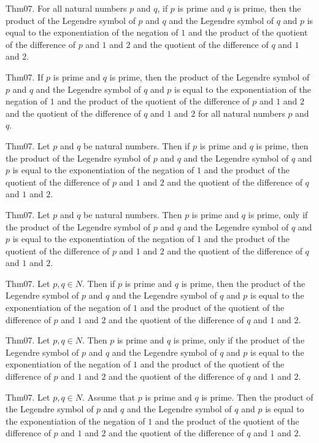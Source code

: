 \documentclass{article}
\begin{document}
Thm07. For all natural numbers $p$ and $q$, if $p$ is prime and $q$ is prime, then the product of the Legendre symbol of $p$ and $q$ and the Legendre symbol of $q$ and $p$ is equal to the exponentiation of the negation of $1$ and the product of the quotient of the difference of $p$ and $1$ and $2$ and the quotient of the difference of $q$ and $1$ and $2$.

Thm07. If $p$ is prime and $q$ is prime, then the product of the Legendre symbol of $p$ and $q$ and the Legendre symbol of $q$ and $p$ is equal to the exponentiation of the negation of $1$ and the product of the quotient of the difference of $p$ and $1$ and $2$ and the quotient of the difference of $q$ and $1$ and $2$ for all natural numbers $p$ and $q$.

Thm07. Let $p$ and $q$ be natural numbers. Then if $p$ is prime and $q$ is prime, then the product of the Legendre symbol of $p$ and $q$ and the Legendre symbol of $q$ and $p$ is equal to the exponentiation of the negation of $1$ and the product of the quotient of the difference of $p$ and $1$ and $2$ and the quotient of the difference of $q$ and $1$ and $2$.

Thm07. Let $p$ and $q$ be natural numbers. Then $p$ is prime and $q$ is prime, only if the product of the Legendre symbol of $p$ and $q$ and the Legendre symbol of $q$ and $p$ is equal to the exponentiation of the negation of $1$ and the product of the quotient of the difference of $p$ and $1$ and $2$ and the quotient of the difference of $q$ and $1$ and $2$.

Thm07. Let $p , q \in N$. Then if $p$ is prime and $q$ is prime, then the product of the Legendre symbol of $p$ and $q$ and the Legendre symbol of $q$ and $p$ is equal to the exponentiation of the negation of $1$ and the product of the quotient of the difference of $p$ and $1$ and $2$ and the quotient of the difference of $q$ and $1$ and $2$.

Thm07. Let $p , q \in N$. Then $p$ is prime and $q$ is prime, only if the product of the Legendre symbol of $p$ and $q$ and the Legendre symbol of $q$ and $p$ is equal to the exponentiation of the negation of $1$ and the product of the quotient of the difference of $p$ and $1$ and $2$ and the quotient of the difference of $q$ and $1$ and $2$.

Thm07. Let $p , q \in N$. Assume that $p$ is prime and $q$ is prime. Then the product of the Legendre symbol of $p$ and $q$ and the Legendre symbol of $q$ and $p$ is equal to the exponentiation of the negation of $1$ and the product of the quotient of the difference of $p$ and $1$ and $2$ and the quotient of the difference of $q$ and $1$ and $2$.
\end{document}
